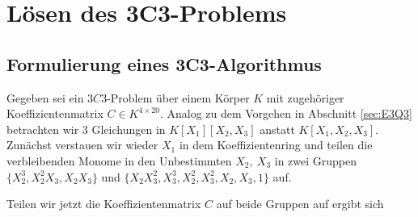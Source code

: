 \documentclass[a4paper,oneside, 11pt, openany%
]{article}
\theoremstyle{custom}
\theoremstyle{custom}
\begin{document}
\newpage
\section{Lösen des 3C3-Problems}
\subsection{Formulierung eines 3C3-Algorithmus}\label{sec:3C3_alg}
Gegeben sei ein $3C3$-Problem über einem Körper $K$ mit zugehöriger Koeffizientenmatrix $C \in K^{4 \times 20}$.
Analog zu dem Vorgehen in Abschnitt \ref{sec:E3Q3} betrachten wir $3$ Gleichungen in $K\left[ X_{1}\right] \left[X_{2},X_{3}\right] $ anstatt $K\left[ X_{1},X_{2},X_{3}\right]$. Zunächst verstauen wir wieder $X_{1}$ in dem Koeffizientenring und teilen die verbleibenden Monome in den Unbestimmten $X_{2},\ X_{3}$ in zwei Gruppen $\{X_{2}^3,X_{2}^2X_{3},X_{2}X_{3}\}$ und $\{X_{2}X_{3}^2,X_{3}^3,X_{2}^2,X_{3}^2,X_{2},X_{3},1\}$ auf.
	
	
	Teilen wir jetzt die Koeffizientenmatrix $C$ auf beide Gruppen auf ergibt sich 
	
\end{document}
